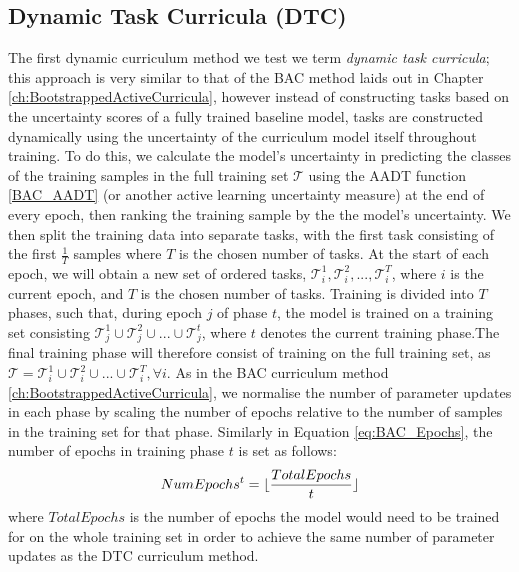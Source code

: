 \subsection{Dynamic Task Curricula (DTC)}
The first dynamic curriculum method we test we term \textit{dynamic task curricula}; this approach is very similar to that of the BAC method laids out in Chapter \ref{ch:BootstrappedActiveCurricula}, however instead of constructing tasks based on the uncertainty scores of a fully trained baseline model, tasks are constructed dynamically using the uncertainty of the curriculum model itself throughout training. To do this, we calculate the model's uncertainty in predicting the classes of the training samples in the full training set $\mathcal{T}$ using the AADT function \ref{BAC_AADT} (or another active learning uncertainty measure) at the end of every epoch, then ranking the training sample by the the model's uncertainty. We then split the training data into separate tasks, with the first task consisting of the first $\frac{1}{T}$ samples where $T$ is the chosen number of tasks. At the start of each epoch, we will obtain a new set of ordered tasks, $\mathcal{T}_i^1, \mathcal{T}_i^2,...,\mathcal{T}_i^T$, where $i$ is the current epoch, and $T$ is the chosen number of tasks. Training is divided into $T$ phases, such that, during epoch $j$ of phase $t$, the model is trained on a training set consisting $\mathcal{T}_j^1 \cup \mathcal{T}_j^2 \cup ... \cup \mathcal{T}_j^t$, where $t$ denotes the current training phase.The final training phase will therefore consist of training on the full training set, as $\mathcal{T} = \mathcal{T}_i^1 \cup \mathcal{T}_i^2 \cup ... \cup \mathcal{T}_i^T, \forall  i$. As in the BAC curriculum method \ref{ch:BootstrappedActiveCurricula}, we normalise the number of parameter updates in each phase by scaling the number of epochs relative to the number of samples in the training set for that phase. Similarly in Equation \ref{eq:BAC_Epochs}, the number of epochs in training phase $t$ is set as follows:
\begin{equation}\label{eq:DTC_Epochs}
NumEpochs^{t} =\lfloor \frac{TotalEpochs}{t}\rfloor
\end{equation}
where $TotalEpochs$ is the number of epochs the model would need to be trained for on the whole training set in order to achieve the same number of parameter updates as the DTC curriculum method.

